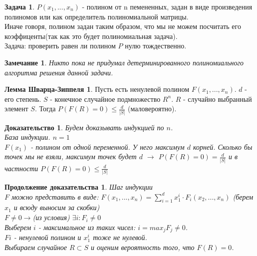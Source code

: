 \documentclass{beamer}
\theoremstyle{plain}
\newtheorem{rmk}[thm]{Замечание}
\newtheorem{proof-rus}[thm]{Доказательство}
\newtheorem{proof-rus-cont}[thm]{Продолжение доказательства}
\theoremstyle{definition}
\newtheorem{prob-rus}[thm]{Задача}
\newtheorem{lsz}[thm]{Лемма Шварца-Зиппеля}
\begin{document}
\begin{frame}
    \begin{prob-rus}
        $P(x_1, ..., x_n)$ - полином от n пемененных, задан в виде произведения полиномов или как определитель полиномиальной матрицы. \\
        Иначе говоря, полином задан таким образом, что мы не можем посчитать его коэффиценты(так как это будет полиномиальная задача). \\
        Задача: проверить равен ли полином $P$ нулю тождественно.
    \end{prob-rus}
    \begin{rmk}
        Никто пока не придумал детерминированного полиномиального алгоритма решения данной задачи.
    \end{rmk}
\end{frame}

\begin{frame}
    \begin{lsz}
        Пусть есть ненулевой полином $F(x_1, ..., x_n)$. $d$ - его степень. $S$ - конечное случайное подмножество $R^n$. $R$ - случайно выбранный элемент $S$. Тогда $P(F(R)=0) \leq \frac{d}{|S|}$ (маловероятно).
    \end{lsz}
    \begin{proof-rus}
        Будем доказывать индукцией по $n$. \\
        База индукции. $n=1$ \\
        $F(x_1)$ - полином от одной переменной. У него максимум $d$ корней. Сколько бы точек мы не взяли, максимум точек будет $d$ $\rightarrow$ $P(F(R)=0)=\frac{d}{|S|}$ и в частности $P(F(R)=0) \leq \frac{d}{|S|}$
        
    \end{proof-rus}
\end{frame}

\begin{frame}
    \begin{proof-rus-cont}
        Шаг индукции\\
        $F$ можно представить в виде:
        $F(x_1, ... , x_n) = \sum_{i=1}^d x_1^i \cdot F_i(x_2, ... , x_n)$ (берем $x_1$ и всюду выносим за скобки) \\
        $F \neq 0 \rightarrow$(из условия) $\exists i: F_i \neq 0$\\
        Выберем $i$ - максимальное из таких чисел: $i = max_{j} F_j \neq 0$.\\
        $Fi$ - ненулевой полином и $x_1^i$ тоже не нулевой. \\
        Выбираем случайное $R \subset S$ и оценим вероятность того, что $F(R) = 0$.
        
    \end{proof-rus-cont}
\end{frame}
\end{document}
